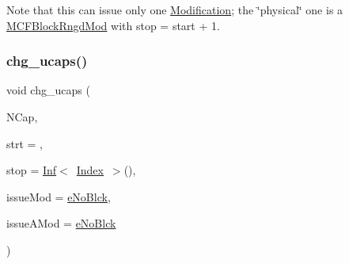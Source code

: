 Note that this can issue only one \mbox{\hyperlink{class_s_m_spp__di__unipi__it_1_1_modification}{Modification}}; the \char`\"{}physical\char`\"{} one is a \mbox{\hyperlink{class_s_m_spp__di__unipi__it_1_1_m_c_f_block_rngd_mod}{M\+C\+F\+Block\+Rngd\+Mod}} with stop = start + 1. \mbox{\label{class_s_m_spp__di__unipi__it_1_1_m_c_f_block_a5ad49ca02b4084f029a45f11e563494f}} 
\subsubsection{\texorpdfstring{chg\+\_\+ucaps()}{chg\_ucaps()}\hspace{0.1cm}{\footnotesize\ttfamily [1/2]}}
{\footnotesize\ttfamily void chg\+\_\+ucaps (\begin{DoxyParamCaption}\item[{\mbox{\hyperlink{class_s_m_spp__di__unipi__it_1_1_m_c_f_block_a2871db0555b42b11ad5315c7f631473b}{c\+\_\+\+Vec\+\_\+\+F\+Number\+\_\+it}}}]{N\+Cap,  }\item[{\mbox{\hyperlink{class_s_m_spp__di__unipi__it_1_1_m_c_f_block_aee6156e2ce80720d57a082d80f39d8cc}{c\+\_\+\+Index}}}]{strt = {},  }\item[{\mbox{\hyperlink{class_s_m_spp__di__unipi__it_1_1_m_c_f_block_ad53d6229d7ec28555a9c9c2fd9abf773}{Index}}}]{stop = {\ttfamily \mbox{\hyperlink{class_s_m_spp__di__unipi__it_1_1_inf}{Inf}}$<$~\mbox{\hyperlink{class_s_m_spp__di__unipi__it_1_1_m_c_f_block_ad53d6229d7ec28555a9c9c2fd9abf773}{Index}}~$>$()},  }\item[{\mbox{\hyperlink{group___modification___t_y_p_e_s_ga544246d8c462e9a2d817c2c30797968f}{c\+\_\+\+Mod\+Param}}}]{issue\+Mod = {\ttfamily \mbox{\hyperlink{group___modification___t_y_p_e_s_gga48fddcdd03a03f49b7e389ca1ed938d4ada69e89c5f46e563d8a13cfa6830c136}{e\+No\+Blck}}},  }\item[{\mbox{\hyperlink{group___modification___t_y_p_e_s_ga544246d8c462e9a2d817c2c30797968f}{c\+\_\+\+Mod\+Param}}}]{issue\+A\+Mod = {\ttfamily \mbox{\hyperlink{group___modification___t_y_p_e_s_gga48fddcdd03a03f49b7e389ca1ed938d4ada69e89c5f46e563d8a13cfa6830c136}{e\+No\+Blck}}} }\end{DoxyParamCaption})}



